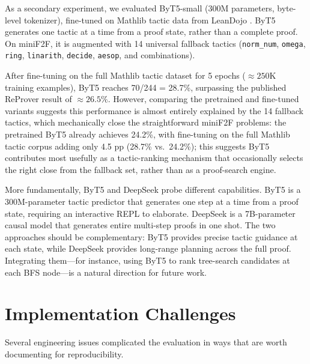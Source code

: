 \documentclass[openany, amssymb, psamsfonts]{amsart}
\theoremstyle{definition}
\numberwithin{equation}{section}
\begin{document}
As a secondary experiment, we evaluated ByT5-small \cite{byt5}
(300M parameters, byte-level tokenizer), fine-tuned on Mathlib tactic data
from LeanDojo \cite{leandojo}.
ByT5 generates one tactic at a time from a proof state, rather than a complete proof.
On miniF2F, it is augmented with 14 universal fallback tactics
(\texttt{norm\_num}, \texttt{omega}, \texttt{ring}, \texttt{linarith}, \texttt{decide},
\texttt{aesop}, and combinations).

After fine-tuning on the full Mathlib tactic dataset for 5 epochs
(${\approx}250\text{K}$ training examples), ByT5 reaches 70/244 = 28.7\%, surpassing
the published ReProver result of ${\approx}26.5\%$.
However, comparing the pretrained and fine-tuned variants suggests this
performance is almost entirely explained by the 14 fallback tactics, which
mechanically close the straightforward miniF2F problems: the pretrained ByT5
already achieves 24.2\%, with fine-tuning on the full Mathlib tactic corpus
adding only 4.5 pp (28.7\% vs.\ 24.2\%);
this suggests ByT5 contributes most usefully as a tactic-ranking mechanism
that occasionally selects the right close from the fallback set, rather than
as a proof-search engine.

More fundamentally, ByT5 and DeepSeek probe different capabilities.
ByT5 is a 300M-parameter tactic predictor that generates one step at a time
from a proof state, requiring an interactive REPL to elaborate.
DeepSeek is a 7B-parameter causal model that generates entire multi-step
proofs in one shot.
The two approaches should be complementary: ByT5 provides precise tactic
guidance at each state, while DeepSeek provides long-range planning across
the full proof.
Integrating them---for instance, using ByT5 to rank tree-search candidates
at each BFS node---is a natural direction for future work.

\section{Implementation Challenges}

Several engineering issues complicated the evaluation in ways that are worth
documenting for reproducibility.
\end{document}
